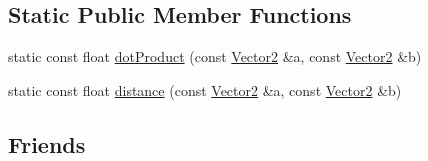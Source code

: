 \subsection*{Static Public Member Functions}
\begin{DoxyCompactItemize}
\item 
static const float \hyperlink{classprism_1_1_vector2_a80de27e0185d45805b1d715a35709b10}{dot\+Product} (const \hyperlink{classprism_1_1_vector2}{Vector2} \&a, const \hyperlink{classprism_1_1_vector2}{Vector2} \&b)
\item 
static const float \hyperlink{classprism_1_1_vector2_a78e9fcd40ead7623db3c2fe6bcaff3e9}{distance} (const \hyperlink{classprism_1_1_vector2}{Vector2} \&a, const \hyperlink{classprism_1_1_vector2}{Vector2} \&b)
\end{DoxyCompactItemize}
\subsection*{Friends}
